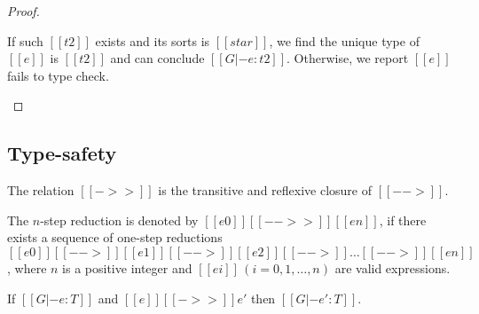 \begin{proof}
\begin{description}
If such $[[t2]]$ exists and its sorts is
$[[star]]$, we find the unique type of $[[e]]$ is $[[t2]]$ and can conclude $[[G |- e:t2]]$. Otherwise, we
report $[[e]]$ fails to type check.
	\end{description}
\end{proof}

\subsection{Type-safety}
\begin{dfn}
    The relation $[[->>]]$ is the transitive and reflexive closure of
$[[-->]]$.
\end{dfn}

\begin{dfn}
    The $n$-step reduction is denoted by $[[e0]] [[-->>]] [[en]]$, if
    there exists a sequence of one-step reductions $[[e0]] [[-->]]
    [[e1]] [[-->]] [[e2]] [[-->]] \dots [[-->]] [[en]]$, where $n$ is
    a positive integer and $[[ei]]\,(i=0,1,\dots,n)$ are valid
    expressions.
\end{dfn}

\begin{thm}
If $[[G |- e:T]]$ and $[[e]] [[->>]] e'$ then $[[G |- e':T]]$.
\end{thm}

